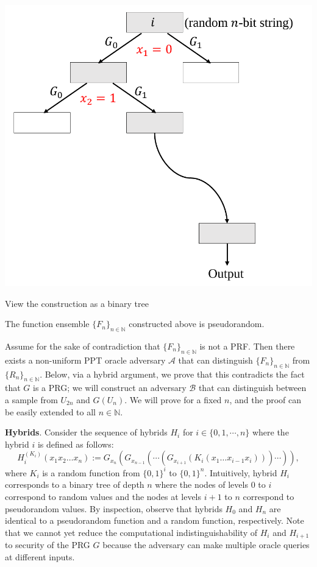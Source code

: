 \documentclass[12pt]{tufte-book}
\newcommand{\ma}{\mathcal{A}}
\begin{document}
\begin{marginfigure}
    \centering
    \includegraphics[width=\textwidth]{Old Scribe Notes/binary-tree.pdf}
    \caption{View the construction as a binary tree}
    \label{fig:binary-tree}
\end{marginfigure}

\begin{theorem}\label{theorem:ggm}
    The function ensemble $\{F_n\}_{n \in \mathbb{N}}$ constructed above is pseudorandom.
\end{theorem}

\proof
Assume for the sake of contradiction that $\{F_n\}_{n \in \mathbb{N}}$ is not a PRF.
Then there exists a non-uniform PPT oracle adversary $\ma$ that can distinguish $\{F_n\}_{n \in \mathbb{N}}$ from $\{R_n\}_{n \in \mathbb{N}}$. Below, via a hybrid argument, we prove that this contradicts the fact that $G$ is a PRG; we will construct an adversary $\mathcal{B}$ that can distinguish between a sample from $U_{2n}$ and $G(U_{n})$. We will prove for a fixed $n$, and the proof can be easily extended to all $n \in \mathbb{N}$.\smallskip

\noindent \textbf{Hybrids}. Consider the sequence of hybrids $H_i$ for $i \in \{ 0, 1, \cdots, n\}$ where the hybrid $i$ is defined as follows:
\[H_{i}^{(K_i)} (x_1x_2\ldots x_n ):= G_{x_n}(G_{x_{n-1}} (\cdots(G_{x_{i+1}}(K_i(x_1\dots x_{i-1}x_i))) \cdots  )), \]
where $K_i$ is a random function from $\{0,1\}^{i}$ to $\{0,1\}^n$. Intuitively, hybrid $H_i$ corresponds to a binary tree of depth $n$ where the nodes of levels $0$ to $i$ correspond to random values and the nodes at levels $i+1$ to $n$ correspond to pseudorandom values. By inspection, observe that hybrids $H_0$ and $H_n$ are identical to a pseudorandom function and a random function, respectively. Note that we cannot yet reduce the computational indistinguishability of $H_i$ and $H_{i+1}$ to security of the PRG $G$ because the adversary can make multiple oracle queries at different inputs.\smallskip
\end{document}
